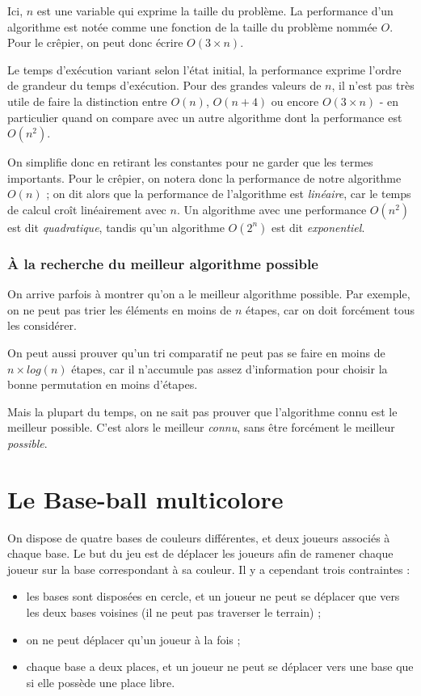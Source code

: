 \documentclass[a5paper,pagesize,DIV=14]{scrbook}
\begin{document}
Ici, $n$ est une variable qui exprime la taille du problème. La performance d'un algorithme est notée comme une fonction de la taille du problème nommée $O$. Pour le crêpier, on peut donc écrire $O(3 \times n)$.

Le temps d'exécution variant selon l'état initial, la performance exprime l'ordre de grandeur du temps d'exécution. Pour des grandes valeurs de $n$, il n'est pas très utile de faire la distinction entre $O(n)$, $O(n+4)$ ou encore $O(3 \times n)$ - en particulier quand on compare avec un autre algorithme dont la performance est $O(n^2)$. 

On simplifie donc en retirant les constantes pour ne garder que les termes importants. Pour le crêpier, on notera donc la performance de notre algorithme $O(n)$ ; on dit alors que la performance de l'algorithme est \textit{linéaire}, car le temps de calcul croît linéairement avec $n$. Un algorithme avec une performance $O(n^2)$ est dit \textit{quadratique}, tandis qu'un algorithme $O(2^n)$ est dit \textit{exponentiel}.

\subsection*{À la recherche du meilleur algorithme possible}

On arrive parfois à montrer qu'on a le meilleur algorithme possible. Par exemple, on ne peut pas trier les éléments en moins de $n$ étapes, car on doit forcément tous les considérer.

On peut aussi prouver qu'un tri comparatif ne peut pas se faire en moins de $n\times log(n)$ étapes, car il n'accumule pas assez d'information pour choisir la bonne permutation en moins d'étapes.

Mais la plupart du temps, on ne sait pas prouver que l'algorithme connu est le meilleur possible. C'est alors le meilleur \textit{connu}, sans être forcément le meilleur \textit{possible}.
    
\chapter*{Le Base-ball multicolore}

On dispose de quatre bases de couleurs différentes, et deux joueurs associés à chaque base. Le but du jeu est de déplacer les joueurs afin de ramener chaque joueur sur la base correspondant à sa couleur. Il y a cependant trois contraintes :

\begin{itemize}
  \item les bases sont disposées en cercle, et un joueur ne peut se déplacer que vers les deux bases voisines (il ne peut pas traverser le terrain) ;
  \item on ne peut déplacer qu'un joueur à la fois ;
  \item chaque base a deux places, et un joueur ne peut se déplacer vers une base que si elle possède une place libre.
\end{itemize}
\end{document}
